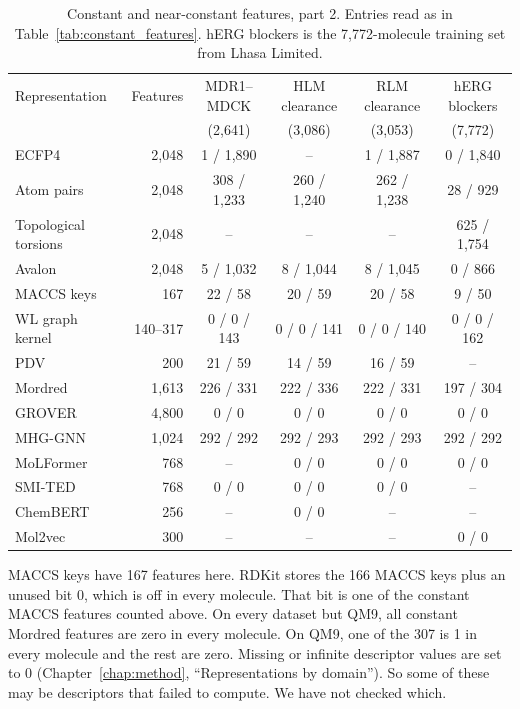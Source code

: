 \begin{table}[htbp]
\centering
\small
\setlength{\tabcolsep}{4pt}
\caption{Constant and near-constant features, part 2. Entries read as in Table~\ref{tab:constant_features}. hERG blockers is the 7,772-molecule training set from Lhasa Limited.}
\label{tab:constant_features_b}
\begin{tabular}{lrcccc}
\toprule
Representation & Features & MDR1--MDCK & HLM clearance & RLM clearance & hERG blockers \\
 & & (2,641) & (3,086) & (3,053) & (7,772) \\
\midrule
ECFP4 & 2,048 & 1 / 1,890 & -- & 1 / 1,887 & 0 / 1,840 \\
Atom pairs & 2,048 & 308 / 1,233 & 260 / 1,240 & 262 / 1,238 & 28 / 929 \\
Topological torsions & 2,048 & -- & -- & -- & 625 / 1,754 \\
Avalon & 2,048 & 5 / 1,032 & 8 / 1,044 & 8 / 1,045 & 0 / 866 \\
MACCS keys & 167 & 22 / 58 & 20 / 59 & 20 / 58 & 9 / 50 \\
WL graph kernel & 140--317 & 0 / 0 / 143 & 0 / 0 / 141 & 0 / 0 / 140 & 0 / 0 / 162 \\
PDV & 200 & 21 / 59 & 14 / 59 & 16 / 59 & -- \\
Mordred & 1,613 & 226 / 331 & 222 / 336 & 222 / 331 & 197 / 304 \\
GROVER & 4,800 & 0 / 0 & 0 / 0 & 0 / 0 & 0 / 0 \\
MHG-GNN & 1,024 & 292 / 292 & 292 / 293 & 292 / 293 & 292 / 292 \\
MoLFormer & 768 & -- & 0 / 0 & 0 / 0 & 0 / 0 \\
SMI-TED & 768 & 0 / 0 & 0 / 0 & 0 / 0 & -- \\
ChemBERT & 256 & -- & 0 / 0 & -- & -- \\
Mol2vec & 300 & -- & -- & -- & 0 / 0 \\
\bottomrule
\end{tabular}
\end{table}

MACCS keys have 167 features here. RDKit stores the 166 MACCS keys plus an unused bit 0, which is off in every molecule. That bit is one of the constant MACCS features counted above. On every dataset but QM9, all constant Mordred features are zero in every molecule. On QM9, one of the 307 is 1 in every molecule and the rest are zero. Missing or infinite descriptor values are set to 0 (Chapter~\ref{chap:method}, ``Representations by domain''). So some of these may be descriptors that failed to compute. We have not checked which.

